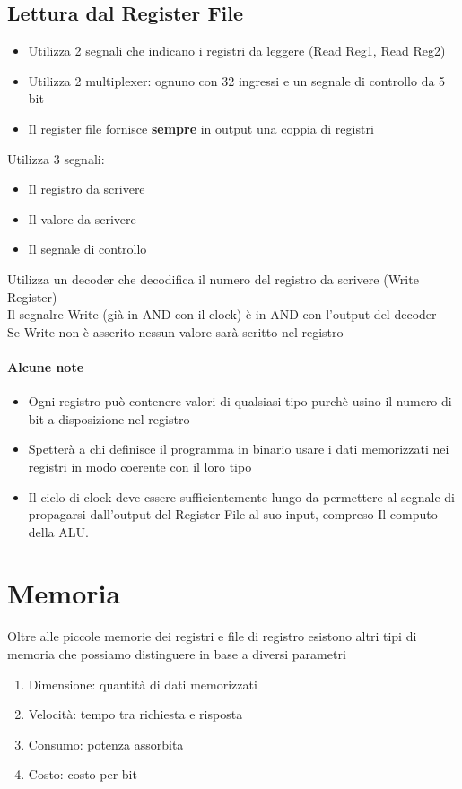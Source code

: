 \documentclass[12pt, a4paper, openany]{book}
\begin{document}
\subsection*{Lettura dal Register File}
\begin{itemize}
    \item Utilizza 2 segnali che indicano i registri da leggere (Read Reg1, Read Reg2)
    \item Utilizza 2 multiplexer: ognuno con 32 ingressi e un segnale di controllo da 5 bit
    \item Il register file fornisce \textbf{sempre} in output una coppia di registri
\end{itemize}
Utilizza 3 segnali: \begin{itemize}
    \item Il registro da scrivere
    \item Il valore da scrivere
    \item Il segnale di controllo
\end{itemize}
Utilizza un decoder che decodifica il numero del registro da scrivere (Write Register)
\\ Il segnalre Write (già in AND con il clock) è in AND con l'output del decoder
\\ Se Write non è asserito nessun valore sarà scritto nel registro
\paragraph*{Alcune note}
\begin{itemize}
    \item Ogni registro può contenere valori di qualsiasi tipo purchè usino il numero
    di bit a disposizione nel registro
    \item Spetterà a chi definisce il programma in binario usare i dati
    memorizzati nei registri in modo coerente con il loro tipo
    \item Il ciclo di clock deve essere sufficientemente lungo da permettere
    al segnale di propagarsi dall'output del Register File al suo input, compreso Il
    computo della ALU.
\end{itemize}
\section{Memoria}
Oltre alle piccole memorie dei registri e file di registro esistono altri tipi di
memoria che possiamo distinguere in base a diversi parametri
\begin{enumerate}
    \item Dimensione: quantità di dati memorizzati
    \item Velocità: tempo tra richiesta e risposta
    \item Consumo: potenza assorbita
    \item Costo: costo per bit
\end{enumerate}
\end{document}
